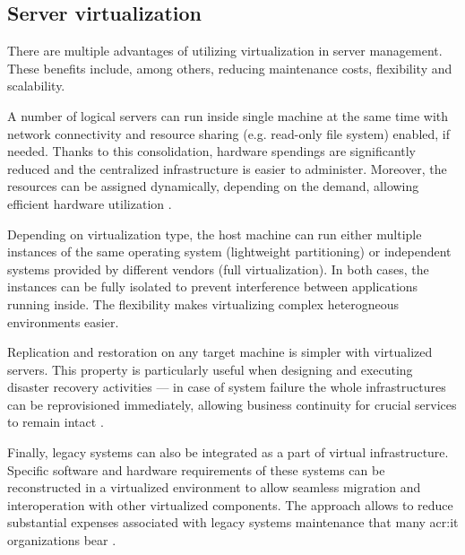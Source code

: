\documentclass[11pt,openany]{book}
\begin{document}


      \subsection{Server virtualization}
        
        There are multiple advantages of utilizing virtualization in server management. These benefits include, among
        others, reducing maintenance costs, flexibility and scalability.

        A number of logical servers can run inside single machine at the same time with network connectivity and
        resource sharing (e.g. read-only file system) enabled, if needed. Thanks to this consolidation, hardware
        spendings are significantly reduced and the centralized infrastructure is easier to administer. Moreover, the
        resources can be assigned dynamically, depending on the demand, allowing efficient hardware utilization
        \cite{server-consolidation}.

        Depending on virtualization type, the host machine can run either multiple instances of the same operating
        system (lightweight partitioning) or independent systems provided by different vendors (full virtualization).
        In both cases, the instances can be fully isolated to prevent interference between applications running inside.
        The flexibility makes virtualizing complex heterogneous environments easier.

        Replication and restoration on any target machine is simpler with virtualized servers. This property is
        particularly useful when designing and executing disaster recovery activities --- in case of system failure the
        whole infrastructures can be reprovisioned immediately, allowing business continuity for crucial services to
        remain intact \cite{vib}.

        Finally, legacy systems can also be integrated as a part of virtual infrastructure. Specific software and
        hardware requirements of these systems can be reconstructed in a virtualized environment to allow seamless
        migration and interoperation with other virtualized components. The approach allows to reduce substantial
        expenses associated with legacy systems maintenance that many \gls{acr:it} organizations bear \cite{boers}.
\end{document}
